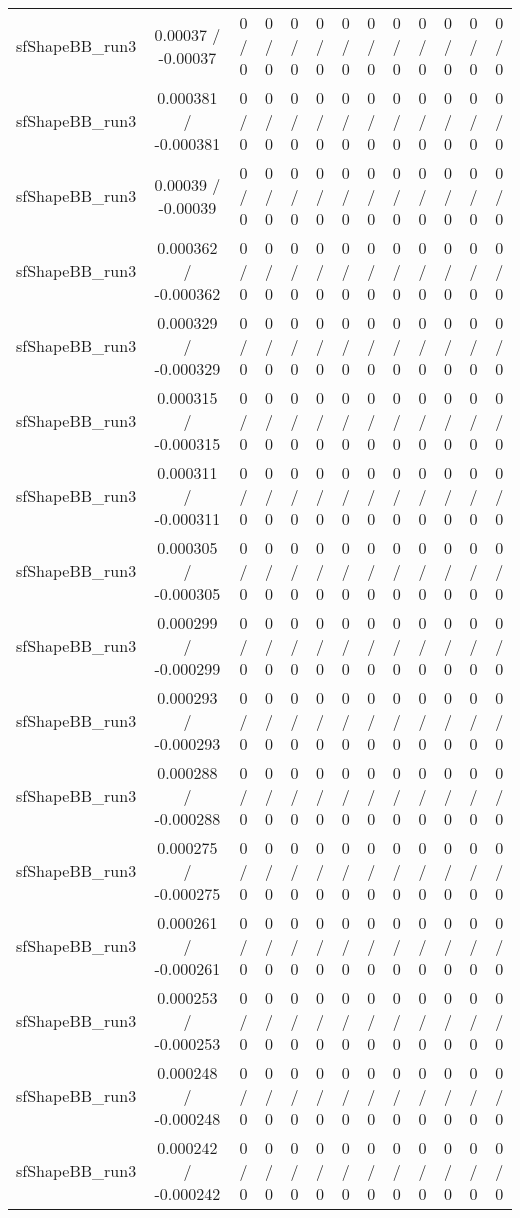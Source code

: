 \documentclass[10pt]{article}
\begin{document}
\begin{table}[htbp]
\begin{center}
\begin{tabular}{|c|c|c|c|c|c|c|c|c|c|c|c|c|}
  sfShapeBB_run3 & 0.00037 / -0.00037 & 0 / 0 & 0 / 0 & 0 / 0 & 0 / 0 & 0 / 0 & 0 / 0 & 0 / 0 & 0 / 0 & 0 / 0 & 0 / 0 & 0 / 0 \\ 
  sfShapeBB_run3 & 0.000381 / -0.000381 & 0 / 0 & 0 / 0 & 0 / 0 & 0 / 0 & 0 / 0 & 0 / 0 & 0 / 0 & 0 / 0 & 0 / 0 & 0 / 0 & 0 / 0 \\ 
  sfShapeBB_run3 & 0.00039 / -0.00039 & 0 / 0 & 0 / 0 & 0 / 0 & 0 / 0 & 0 / 0 & 0 / 0 & 0 / 0 & 0 / 0 & 0 / 0 & 0 / 0 & 0 / 0 \\ 
  sfShapeBB_run3 & 0.000362 / -0.000362 & 0 / 0 & 0 / 0 & 0 / 0 & 0 / 0 & 0 / 0 & 0 / 0 & 0 / 0 & 0 / 0 & 0 / 0 & 0 / 0 & 0 / 0 \\ 
  sfShapeBB_run3 & 0.000329 / -0.000329 & 0 / 0 & 0 / 0 & 0 / 0 & 0 / 0 & 0 / 0 & 0 / 0 & 0 / 0 & 0 / 0 & 0 / 0 & 0 / 0 & 0 / 0 \\ 
  sfShapeBB_run3 & 0.000315 / -0.000315 & 0 / 0 & 0 / 0 & 0 / 0 & 0 / 0 & 0 / 0 & 0 / 0 & 0 / 0 & 0 / 0 & 0 / 0 & 0 / 0 & 0 / 0 \\ 
  sfShapeBB_run3 & 0.000311 / -0.000311 & 0 / 0 & 0 / 0 & 0 / 0 & 0 / 0 & 0 / 0 & 0 / 0 & 0 / 0 & 0 / 0 & 0 / 0 & 0 / 0 & 0 / 0 \\ 
  sfShapeBB_run3 & 0.000305 / -0.000305 & 0 / 0 & 0 / 0 & 0 / 0 & 0 / 0 & 0 / 0 & 0 / 0 & 0 / 0 & 0 / 0 & 0 / 0 & 0 / 0 & 0 / 0 \\ 
  sfShapeBB_run3 & 0.000299 / -0.000299 & 0 / 0 & 0 / 0 & 0 / 0 & 0 / 0 & 0 / 0 & 0 / 0 & 0 / 0 & 0 / 0 & 0 / 0 & 0 / 0 & 0 / 0 \\ 
  sfShapeBB_run3 & 0.000293 / -0.000293 & 0 / 0 & 0 / 0 & 0 / 0 & 0 / 0 & 0 / 0 & 0 / 0 & 0 / 0 & 0 / 0 & 0 / 0 & 0 / 0 & 0 / 0 \\ 
  sfShapeBB_run3 & 0.000288 / -0.000288 & 0 / 0 & 0 / 0 & 0 / 0 & 0 / 0 & 0 / 0 & 0 / 0 & 0 / 0 & 0 / 0 & 0 / 0 & 0 / 0 & 0 / 0 \\ 
  sfShapeBB_run3 & 0.000275 / -0.000275 & 0 / 0 & 0 / 0 & 0 / 0 & 0 / 0 & 0 / 0 & 0 / 0 & 0 / 0 & 0 / 0 & 0 / 0 & 0 / 0 & 0 / 0 \\ 
  sfShapeBB_run3 & 0.000261 / -0.000261 & 0 / 0 & 0 / 0 & 0 / 0 & 0 / 0 & 0 / 0 & 0 / 0 & 0 / 0 & 0 / 0 & 0 / 0 & 0 / 0 & 0 / 0 \\ 
  sfShapeBB_run3 & 0.000253 / -0.000253 & 0 / 0 & 0 / 0 & 0 / 0 & 0 / 0 & 0 / 0 & 0 / 0 & 0 / 0 & 0 / 0 & 0 / 0 & 0 / 0 & 0 / 0 \\ 
  sfShapeBB_run3 & 0.000248 / -0.000248 & 0 / 0 & 0 / 0 & 0 / 0 & 0 / 0 & 0 / 0 & 0 / 0 & 0 / 0 & 0 / 0 & 0 / 0 & 0 / 0 & 0 / 0 \\ 
  sfShapeBB_run3 & 0.000242 / -0.000242 & 0 / 0 & 0 / 0 & 0 / 0 & 0 / 0 & 0 / 0 & 0 / 0 & 0 / 0 & 0 / 0 & 0 / 0 & 0 / 0 & 0 / 0 \\ 

\end{tabular}
\end{center}
\end{table}
\end{document}
